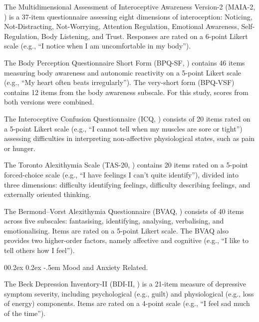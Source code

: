 \documentclass[
  jou,
  floatsintext,
  longtable,
  nolmodern,
  notxfonts,
  notimes,
  colorlinks=true,linkcolor=blue,citecolor=blue,urlcolor=blue]{apa7}
\makeatletter
\renewcommand{\paragraph}{\@startsection{paragraph}{4}{\parindent}%
	{0\baselineskip \@plus 0.2ex \@minus 0.2ex}%
	{-.5em}%
	{\normalfont\normalsize\bfseries\typesectitle}}
\makeatother
\begin{document}
The Multidimensional Assessment of Interoceptive Awareness Version-2
(MAIA-2, ) is a 37-item questionnaire assessing eight dimensions of
interoception: Noticing, Not-Distracting, Not-Worrying, Attention
Regulation, Emotional Awareness, Self-Regulation, Body Listening, and
Trust. Responses are rated on a 6-point Likert scale (e.g., ``I notice
when I am uncomfortable in my body'').

The Body Perception Questionnaire Short Form (BPQ-SF,
) contains 46
items measuring body awareness and autonomic reactivity on a 5-point
Likert scale (e.g., ``My heart often beats irregularly''). The
very-short form (BPQ-VSF) contains 12 items from the body awareness
subscale. For this study, scores from both versions were combined.

The Interoceptive Confusion Questionnaire (ICQ,
) consists of
20 items rated on a 5-point Likert scale (e.g., ``I cannot tell when my
muscles are sore or tight'') assessing difficulties in interpreting
non-affective physiological states, such as pain or hunger.

The Toronto Alexithymia Scale (TAS-20,
) contains 20 items
rated on a 5-point forced-choice scale (e.g., ``I have feelings I can't
quite identify''), divided into three dimensions: difficulty identifying
feelings, difficulty describing feelings, and externally oriented
thinking.

The Bermond--Vorst Alexithymia Questionnaire (BVAQ,
) consists of 40
items across five subscales: fantasising, identifying, analysing,
verbalising, and emotionalising. Items are rated on a 5-point Likert
scale. The BVAQ also provides two higher-order factors, namely affective
and cognitive (e.g., ``I like to tell others how I feel'').

\paragraph{Mood and Anxiety Related.}\label{mood-and-anxiety-related}

The Beck Depression Inventory-II (BDI-II,
) is a 21-item measure of
depressive symptom severity, including psychological (e.g., guilt) and
physiological (e.g., loss of energy) components. Items are rated on a
4-point scale (e.g., ``I feel sad much of the time'').
\end{document}
